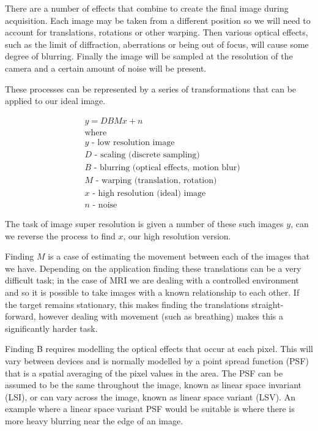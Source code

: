 There are a number of effects that combine to create the final image during acquisition. Each image may be taken from a different position so we will need to account for translations, rotations or other warping. Then various optical effects, such as the limit of diffraction, aberrations or being out of focus, will cause some degree of blurring. Finally the image will be sampled at the resolution of the camera and a certain amount of noise will be present.

These processes can be represented by a series of transformations that can be applied to our ideal image.

\begin{align*} 
& y = DBMx + n \nonumber \\ 
& \text{where} \\
& y \text{ - low resolution image} \nonumber \\
& D \text{ - scaling (discrete sampling)} \nonumber \\
& B \text{ - blurring (optical effects, motion blur)} \nonumber \\
& M \text{ - warping (translation, rotation)} \nonumber \\
& x \text{ - high resolution (ideal) image} \nonumber \\
& n \text{ - noise} \nonumber
\end{align*}

The task of image super resolution is given a number of these such images $y$, can we reverse the process to find $x$, our high resolution version.

Finding $M$ is a case of estimating the movement between each of the images that we have. Depending on the application finding these translations can be a very difficult task; in the case of MRI we are dealing with a controlled environment and so it is possible to take images with a known relationship to each other. If the target remains stationary, this makes finding the translations straight-forward, however dealing with movement (such as breathing) makes this a significantly harder task.

Finding B requires modelling the optical effects that occur at each pixel. This will vary between devices and is normally modelled by a point spread function (PSF) that is a spatial averaging of the pixel values in the area. The PSF can be assumed to be the same throughout the image, known as linear space invariant (LSI), or can vary across the image, known as linear space variant (LSV). An example where a linear space variant PSF would be suitable is where there is more heavy blurring near the edge of an image.

